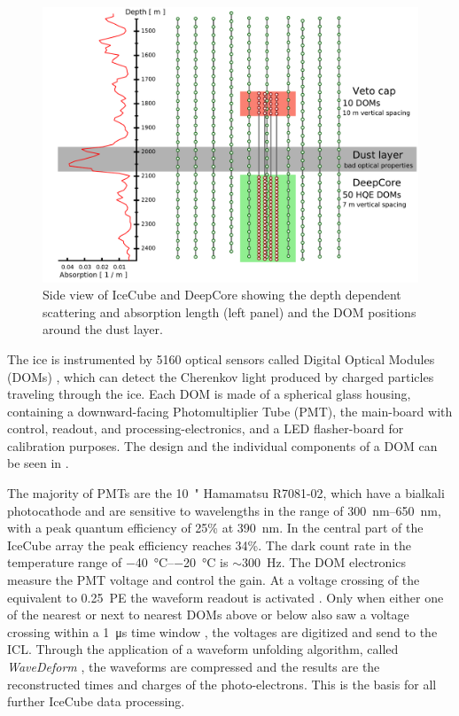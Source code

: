 \begin{figure}[h]
    \includegraphics{figures/icecube_deepcore/DeepCore_sideview.pdf}
	\caption[IceCube sideview]{Side view of IceCube and DeepCore showing the depth dependent scattering and absorption length (left panel) and the DOM positions around the dust layer.}
\end{figure}



The ice is instrumented by 5160 optical sensors called Digital Optical Modules (DOMs) , which can detect the Cherenkov light produced by charged particles traveling through the ice. Each DOM is made of a spherical glass housing, containing a downward-facing Photomultiplier Tube (PMT), the main-board with control, readout, and processing-electronics, and a LED flasher-board for calibration purposes. The design and the individual components of a DOM can be seen in .

The majority of PMTs are the \SI{10}{"} Hamamatsu R7081-02, which have a bialkali photocathode and are sensitive to wavelengths in the range of \SIrange{300}{650}{\nano\metre}, with a peak quantum efficiency of 25\% at \SI{390}{\nano\metre}. In the central part of the IceCube array the peak efficiency reaches 34\%. The dark count rate in the temperature range of \SIrange{-40}{-20}{\degreeCelsius} is $\sim$\SI{300}{\hertz}. The DOM electronics measure the PMT voltage and control the gain. At a voltage crossing of the equivalent to \SI{0.25}{PE} the waveform readout is activated . Only when either one of the nearest or next to nearest DOMs above or below also saw a voltage crossing within a \SI{1}{\micro\second} time window , the voltages are digitized and send to the ICL. Through the application of a waveform unfolding algorithm, called \textit{WaveDeform} , the waveforms are compressed and the results are the reconstructed times and charges of the photo-electrons. This is the basis for all further IceCube data processing.

